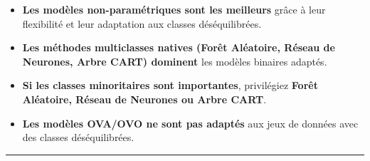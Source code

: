 \documentclass[
]{article}
\providecommand{\tightlist}{%
  \setlength{\itemsep}{0pt}\setlength{\parskip}{0pt}}\usepackage{longtable,booktabs,array}
\begin{document}
\begin{itemize}
\tightlist
\item
  \textbf{Les modèles non-paramétriques sont les meilleurs} grâce à leur
  flexibilité et leur adaptation aux classes déséquilibrées.
\item
  \textbf{Les méthodes multiclasses natives (Forêt Aléatoire, Réseau de
  Neurones, Arbre CART) dominent} les modèles binaires adaptés.
\item
  \textbf{Si les classes minoritaires sont importantes}, privilégiez
  \textbf{Forêt Aléatoire, Réseau de Neurones ou Arbre CART}.
\item
  \textbf{Les modèles OVA/OVO ne sont pas adaptés} aux jeux de données
  avec des classes déséquilibrées.
\end{itemize}

\begin{center}\rule{0.5\linewidth}{0.5pt}\end{center}
\end{document}
